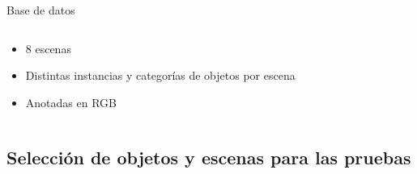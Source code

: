 \documentclass[]{beamer}
\begin{document}
\begin{frame}{Base de datos}
\begin{columns}[t]
\begin{column}{5cm}
            \begin{itemize}
                \item 8 escenas
                \item Distintas instancias y categorías de objetos por escena
                \item Anotadas en RGB
            \end{itemize}

        \end{column}
    \end{columns}
\end{frame}

\subsection{Selección de objetos y escenas para las pruebas}
\end{document}
